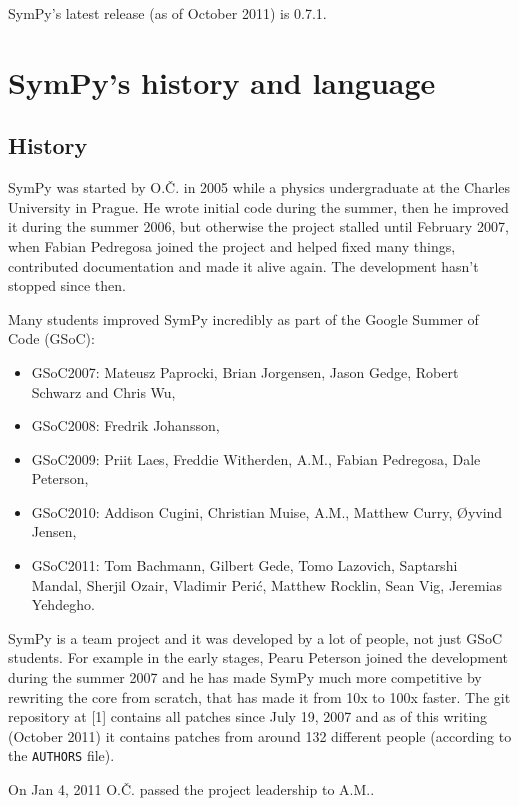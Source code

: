 \documentclass[12pt]{article}
\def\OC{O.Č.}
\def\AM{A.M.}
\begin{document}
SymPy's latest release (as of October 2011) is 0.7.1.

\section{SymPy's history and language}

\subsection{History}

SymPy was started by \OC{} in 2005 while a
physics undergraduate at the Charles University in Prague.
He wrote initial code during the
summer, then he improved it during the summer 2006, but otherwise the project
stalled until February 2007, when
Fabian Pedregosa joined the project and helped fixed many things, contributed
documentation and made it alive again. The development hasn't stopped since
then.

Many students improved SymPy incredibly
as part of the Google Summer of Code (GSoC):
\begin{itemize}
\item
GSoC2007: Mateusz Paprocki, Brian
Jorgensen, Jason Gedge, Robert Schwarz and Chris Wu,
\item
GSoC2008: Fredrik Johansson,

\item
GSoC2009: Priit Laes, Freddie Witherden, \AM,
Fabian Pedregosa, Dale Peterson,

\item
GSoC2010:
Addison Cugini, Christian Muise, \AM, Matthew Curry,
{\O}yvind Jensen,

\item
GSoC2011: Tom Bachmann, Gilbert Gede, Tomo Lazovich, Saptarshi Mandal,
Sherjil Ozair, Vladimir Peri\'c,  Matthew Rocklin, Sean Vig, Jeremias Yehdegho.
\end{itemize}

\noindent
SymPy is a team project and it was developed by a lot of people, not
just GSoC students. For example in the early stages, Pearu Peterson
joined the development during the summer 2007 and he has made SymPy much more
competitive by rewriting the core from scratch, that has made it from 10x to
100x faster. The git repository at [1] contains all patches since July 19, 2007
and as of this writing (October 2011) it contains patches from around 132
different people (according to the {\tt AUTHORS} file).

On Jan 4, 2011 \OC{} passed the project leadership to \AM.
\end{document}
